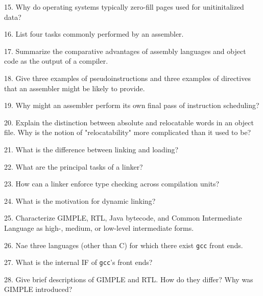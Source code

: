 \filbreak
\vskip 1cm

15. Why do operating systems typically zero-fill pages used for unitinitalized data?

\filbreak
\vskip 1cm

16. List four tasks commonly performed by an assembler.

\filbreak
\vskip 1cm

17. Summarize the comparative advantages of assembly languages and object code as the output of a compiler.

\filbreak
\vskip 1cm

18. Give three examples of pseudoinstructions and three examples of directives that an assembler might be likely to provide.

\filbreak
\vskip 1cm

19. Why might an assembler perform its own final pass of instruction scheduling?

\filbreak
\vskip 1cm

20. Explain the distinction between absolute and relocatable words in an object file. Why is the notion of "relocatability" more complicated than it used to be?

\filbreak
\vskip 1cm

21. What is the difference between linking and loading?

\filbreak
\vskip 1cm

22. What are the principal tasks of a linker?

\filbreak
\vskip 1cm

23. How can a linker enforce type checking across compilation units?

\filbreak
\vskip 1cm

24. What is the motivation for dynamic linking?

\filbreak
\vskip 1cm

25. Characterize GIMPLE, RTL, Java bytecode, and Common Intermediate Language as high-, medium, or low-level intermediate forms.

\filbreak
\vskip 1cm

26. Nae three languages (other than C) for which there exist {\tt gcc} front ends.

\filbreak
\vskip 1cm

27. What is the internal IF of {\tt gcc}'s front ends?

\filbreak
\vskip 1cm

28. Give brief descriptions of GIMPLE and RTL. How do they differ? Why was GIMPLE introduced?

